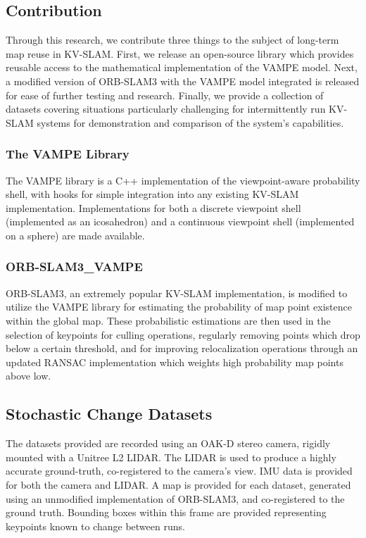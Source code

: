 \subsection{Contribution}

Through this research, we contribute three things to the subject of long-term map reuse in KV-SLAM. First, we release an open-source library which provides reusable access to the mathematical implementation of the VAMPE model. Next, a modified version of ORB-SLAM3 with the VAMPE model integrated is released for ease of further testing and research. Finally, we provide a collection of datasets covering situations particularly challenging for intermittently run KV-SLAM systems for demonstration and comparison of the system's capabilities.

\subsubsection{The VAMPE Library}
The VAMPE library is a C++ implementation of the viewpoint-aware probability shell, with hooks for simple integration into any existing KV-SLAM implementation. Implementations for both a discrete viewpoint shell (implemented as an icosahedron) and a continuous viewpoint shell (implemented on a sphere) are made available.

\subsubsection{ORB-SLAM3\_VAMPE}
ORB-SLAM3, an extremely popular KV-SLAM implementation, is modified to utilize the VAMPE library for estimating the probability of map point existence within the global map. These probabilistic estimations are then used in the selection of keypoints for culling operations, regularly removing points which drop below a certain threshold, and for improving relocalization operations through an updated RANSAC implementation which weights high probability map points above low.

\subsection{Stochastic Change Datasets}
The datasets provided are recorded using an OAK-D stereo camera, rigidly mounted with a Unitree L2 LIDAR. The LIDAR is used to produce a highly accurate ground-truth, co-registered to the camera's view. IMU data is provided for both the camera and LIDAR. A map is provided for each dataset, generated using an unmodified implementation of ORB-SLAM3, and co-registered to the ground truth. Bounding boxes within this frame are provided representing keypoints known to change between runs.